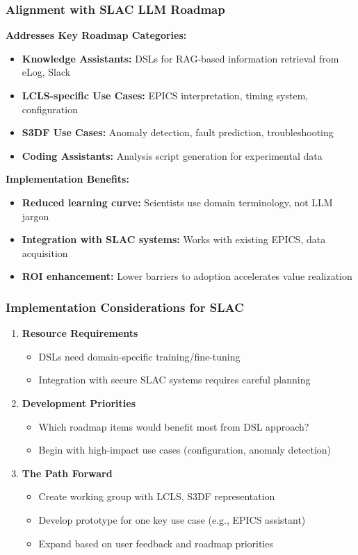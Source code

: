 \documentclass{beamer}
\begin{document}
\begin{frame}
\frametitle{Alignment with SLAC LLM Roadmap}

\textbf{Addresses Key Roadmap Categories:}
\begin{itemize}
\item \textbf{Knowledge Assistants:} DSLs for RAG-based information retrieval from eLog, Slack
\item \textbf{LCLS-specific Use Cases:} EPICS interpretation, timing system, configuration
\item \textbf{S3DF Use Cases:} Anomaly detection, fault prediction, troubleshooting
\item \textbf{Coding Assistants:} Analysis script generation for experimental data
\end{itemize}

\vspace{0.3cm}

\textbf{Implementation Benefits:}
\begin{itemize}
\item \textbf{Reduced learning curve:} Scientists use domain terminology, not LLM jargon
\item \textbf{Integration with SLAC systems:} Works with existing EPICS, data acquisition
\item \textbf{ROI enhancement:} Lower barriers to adoption accelerates value realization
\end{itemize}
\end{frame}

\begin{frame}
\frametitle{Implementation Considerations for SLAC}

\begin{enumerate}
\item \textbf{Resource Requirements}
   \begin{itemize}
   \item DSLs need domain-specific training/fine-tuning
   \item Integration with secure SLAC systems requires careful planning
   \end{itemize}

\item \textbf{Development Priorities}
   \begin{itemize}
   \item Which roadmap items would benefit most from DSL approach?
   \item Begin with high-impact use cases (configuration, anomaly detection)
   \end{itemize}

\item \textbf{The Path Forward}
   \begin{itemize}
   \item Create working group with LCLS, S3DF representation
   \item Develop prototype for one key use case (e.g., EPICS assistant)
   \item Expand based on user feedback and roadmap priorities
   \end{itemize}
\end{enumerate}
\end{frame}
\end{document}
